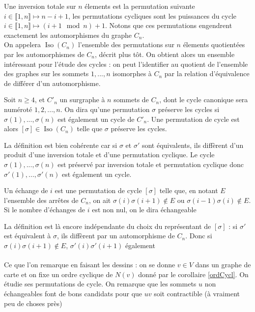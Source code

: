 \documentclass{scrartcl}
\begin{document}
\begin{flushleft}
Une inversion totale sur $n$ élements est la permutation suivante $ i \in \llbracket 1, n \rrbracket \longmapsto n - i + 1$,
les permutations cycliques sont les puissances du cycle $ i \in \llbracket 1, n \rrbracket \longmapsto (i+1 \mod n) + 1$.
Notons que ces permutations engendrent exactement les automorphismes du graphe $C_n$.\\
On appelera $\operatorname*{Iso}(C_n)$ l'ensemble des permutations sur $n$ élements quotientées par les automorphismes de
$C_n$, décrit plus tôt. On obtient alors un ensemble intéressant pour l'étude des cycles : on peut l'identifier
au quotient de l'ensemble des graphes sur les sommets $1, ..., n$ isomorphes à $C_n$ par la relation d'équivalence de différer
d'un automorphisme.

\begin{def*}
    Soit $n \geq 4$, et $C'_n$ un surgraphe à $n$ sommets de $C_n$, dont le cycle canonique sera numéroté $1, 2, ..., n$.
    On dira qu'une permutation $\sigma$ préserve les cycles si $\sigma(1), ..., \sigma(n)$ est également un cycle de $C'_n$.
    Une permutation de cycle est alors $[\sigma] \in \operatorname*{Iso}(C_n)$ telle que $\sigma$ préserve les cycles.
\end{def*}

La définition est bien cohérente car si $\sigma$ et $\sigma'$ sont équivalents, ils diffèrent d'un produit d'une inversion totale
et d'une permutation cyclique. Le cycle $\sigma(1), ..., \sigma(n)$ est préservé par inversion totale et permutation cyclique donc
$\sigma'(1), ..., \sigma'(n)$ est également un cycle.

\begin{def*}[Echange]
    Un échange de $i$ est une permutation de cycle $[\sigma]$ telle que, en notant $E$ l'ensemble des arrêtes de $C_n$,
    on ait $\sigma(i)\sigma(i+1) \notin E$ ou $\sigma(i-1)\sigma(i) \notin E$. Si le nombre d'échanges de $i$ est non nul,
    on le dira échangeable
\end{def*}

La définition est là encore indépendante du choix du représentant de $[\sigma]$ : si $\sigma'$ est équivalent à $\sigma$,
ils diffèrent par un automorphisme de $C_n$. Donc si $\sigma(i)\sigma(i+1) \notin E$, $\sigma'(i)\sigma'(i+1)$ également
\\~\\
Ce que l'on remarque en faisant les dessins : on se donne $v \in V$ dans un graphe de carte et on fixe un ordre
cyclique de $N(v)$ donné par le corollaire \ref{ordCycl}. On étudie ses permutations de cycle. On remarque que les sommets
$u$ non échangeables font de bons candidats pour que $uv$ soit contractible (à vraiment peu de choses près)


\end{flushleft}
\end{document}
